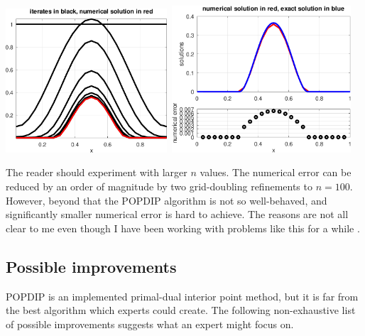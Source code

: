 \documentclass[11pt]{article}
\begin{document}
\medskip
\noindent \mbox{\includegraphics[width=0.45\textwidth]{figs/iteratesobstacle.pdf} \qquad
\includegraphics[width=0.5\textwidth]{figs/errorobstacle.pdf}}

The reader should experiment with larger $n$ values.  The numerical error can be reduced by an order of magnitude by two grid-doubling refinements to $n=100$.  However, beyond that the POPDIP algorithm is not so well-behaved, and significantly smaller numerical error is hard to achieve.  The reasons are not all clear to me even though I have been working with problems like this for a while \cite{Bueler2016}.




\subsection*{Possible improvements}

POPDIP is an implemented primal-dual interior point method, but it is far from the best algorithm which experts could create.  The following non-exhaustive list of possible improvements suggests what an expert might focus on.
\end{document}
